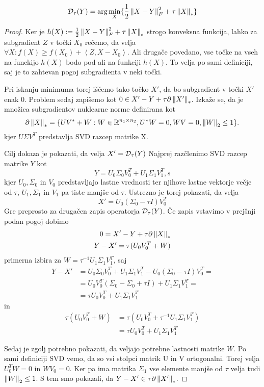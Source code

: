 \begin{theorem}
\begin{align}
    \label{2906-1056}
    \mathcal{D}_\tau(Y) = \arg \min_{X} \{ \frac{1}{2} \left\lVert X-Y\right\rVert_F^2 + \tau\left\lVert X\right\rVert_* \}
\end{align}
\end{theorem}

\begin{proof}
Ker je $h(X) := \frac{1}{2} \left\lVert X-Y\right\rVert_F^2 + \tau\left\lVert X\right\rVert_* $ strogo konveksna funkcija, lahko za subgradient $Z$ v točki $X_0$ rečemo, da velja $\forall X: f(X) \geq  f(X_0) + \left< Z, X - X_0 \right>$. Ali drugače povedano, vse točke na vseh  na funckijo $h(X)$ bodo pod ali na funkciji $h(X)$. To velja po sami definiciji, saj je to zahtevan pogoj subgradienta v neki točki.

Pri iskanju minimuma torej iščemo tako točko $X'$, da bo subgradient v točki $X'$ enak 0. Problem sedaj zapišemo kot $0 \in X' - Y + \tau \partial\left\lVert X'\right\rVert_*$. Izkaže se, da je množica subgradientov nuklearne norme definirana kot
\[
    \partial\left\lVert X\right\rVert_* = \{UV^* + W: W \in \mathbb{R}^{n_1 \times n_2}, U^*W = 0, WV = 0, \left\lVert W\right\rVert_2 \leq 1 \}.
\]
kjer $U \Sigma V^T$ predstavlja SVD razcep matrike X. \cite{CCS}

Cilj dokaza je pokazati, da velja $X' = \mathcal{D}_\tau(Y)$ Najprej razčlenimo SVD razcep matrike $Y$ kot 
\[
    Y = U_0\Sigma_0V_0^T + U_1\Sigma_1V_1^T,s
\]
kjer $U_0, \Sigma_0$ in $V_0$ predstavljajo lastne vrednosti ter njihove lastne vektorje večje od $\tau$, $U_1, \Sigma_1$ in $V_1$ pa tiste manjše od $\tau$. Ustrezno je torej pokazati, da velja 
\[
    X' = U_0(\Sigma_0 - \tau I)V_0^T
\] Gre preprosto za drugačen zapis operatorja $\mathcal{D}_\tau(Y)$.
Če zapis vstavimo v prejšnji podan pogoj dobimo
\begin{align*}
    0 = X' - Y + \tau \partial \left\lVert X\right\rVert_*\\
    Y- X' = \tau (U_0 V_0^T + W)
\end{align*}
primerna izbira za $W = \tau^{-1} U_1 \Sigma_1 V_1^T$, saj
\begin{align*}
    Y-X' &= U_0\Sigma_0V_0^T + U_1\Sigma_1V_1^T - U_0(\Sigma_0 - \tau I)V_0^T =\\ 
    &= U_0V_0^T(\Sigma_0 - \Sigma_0 + \tau I) + U_1\Sigma_1 V_1^T = \\
    &= \tau U_0 V_0^T + U_1\Sigma_1 V_1^T
\end{align*}
in 
\begin{align*}
    \tau(U_0 V_0^T + W) &= \tau(U_0V_0^T + \tau^{-1} U_1 \Sigma_1 V_1^T)\\ 
    &= \tau U_0 V_0^T + U_1 \Sigma_1 V_1^T 
\end{align*}

Sedaj je zgolj potrebno pokazati, da veljajo potrebne lastnosti matrike $W$.
Po sami definiciji SVD vemo, da so vsi stolpci matrik U in V ortogonalni. Torej velja $U_0^TW = 0$ in $WV_0 = 0$. Ker pa ima matrika $\Sigma_1$ vse elemente manjše od $\tau$ velja tudi $\left\lVert W\right\rVert_2 \leq 1$. S tem smo pokazali, da $Y - X' \in \tau \partial \left\lVert X'\right\rVert_*$.
\end{proof}

